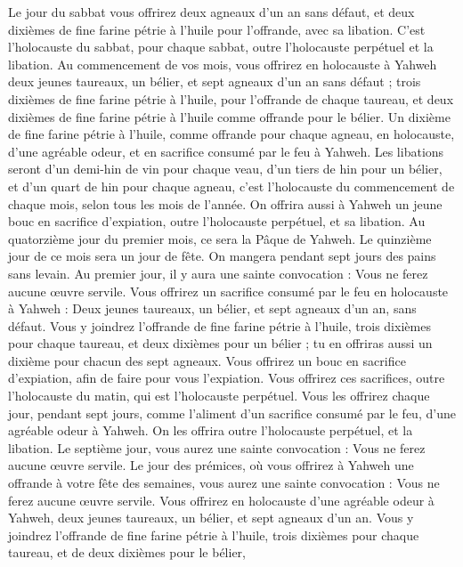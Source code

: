\begin{multicols}{2}
Le jour du sabbat vous offrirez deux agneaux d'un an sans défaut, et deux dixièmes de fine farine pétrie à l'huile pour l’offrande, avec sa libation.
C'est l'holocauste du sabbat, pour chaque sabbat, outre l'holocauste perpétuel et la libation.
Au commencement de vos mois, vous offrirez en holocauste à Yahweh deux jeunes taureaux, un bélier, et sept agneaux d'un an sans défaut ;
trois dixièmes de fine farine pétrie à l'huile, pour l’offrande de chaque taureau, et deux dixièmes de fine farine pétrie à l'huile comme offrande pour le bélier.
Un dixième de fine farine pétrie à l'huile, comme offrande pour chaque agneau, en holocauste, d’une agréable odeur, et en sacrifice consumé par le feu à Yahweh.
Les libations seront d'un demi-hin de vin pour chaque veau, d’un tiers de hin pour un bélier, et d’un quart de hin pour chaque agneau, c'est l'holocauste du commencement de chaque mois, selon tous les mois de l'année.
On offrira aussi à Yahweh un jeune bouc en sacrifice d’expiation, outre l'holocauste perpétuel, et sa libation.
Au quatorzième jour du premier mois, ce sera la Pâque de Yahweh.
Le quinzième jour de ce mois sera un jour de fête. On mangera pendant sept jours des pains sans levain.
Au premier jour, il y aura une sainte convocation : Vous ne ferez aucune œuvre servile.
Vous offrirez un sacrifice consumé par le feu en holocauste à Yahweh : Deux jeunes taureaux, un bélier, et sept agneaux d'un an, sans défaut.
Vous y joindrez l’offrande de fine farine pétrie à l'huile, trois dixièmes pour chaque taureau, et deux dixièmes pour un bélier ;
tu en offriras aussi un dixième pour chacun des sept agneaux.
Vous offrirez un bouc en sacrifice d’expiation, afin de faire pour vous l’expiation.
Vous offrirez ces sacrifices, outre l'holocauste du matin, qui est l'holocauste perpétuel.
Vous les offrirez chaque jour, pendant sept jours, comme l’aliment d’un sacrifice consumé par le feu, d’une agréable odeur à Yahweh. On les offrira outre l'holocauste perpétuel, et la libation.
Le septième jour, vous aurez une sainte convocation : Vous ne ferez aucune œuvre servile.
Le jour des prémices, où vous offrirez à Yahweh une offrande à votre fête des semaines, vous aurez une sainte convocation : Vous ne ferez aucune œuvre servile.
Vous offrirez en holocauste d’une agréable odeur à Yahweh, deux jeunes taureaux, un bélier, et sept agneaux d'un an.
Vous y joindrez l’offrande de fine farine pétrie à l'huile, trois dixièmes pour chaque taureau, et de deux dixièmes pour le bélier,

\end{multicols}
